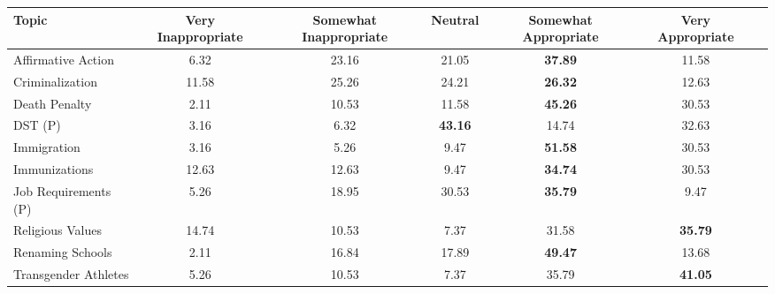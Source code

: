 \begin{tabular}{l*{6}c}\toprule 
Topic & Very Inappropriate & Somewhat Inappropriate & Neutral & Somewhat Appropriate & Very Appropriate \\
\midrule
Affirmative Action & 6.32 & 23.16 & 21.05 & \textbf{37.89} & 11.58 \\
Criminalization & 11.58 & 25.26 & 24.21 & \textbf{26.32} & 12.63 \\
Death Penalty & 2.11 & 10.53 & 11.58 & \textbf{45.26} & 30.53 \\
DST (P) & 3.16 & 6.32 & \textbf{43.16} & 14.74 & 32.63 \\
Immigration & 3.16 & 5.26 & 9.47 & \textbf{51.58} & 30.53 \\
Immunizations & 12.63 & 12.63 & 9.47 & \textbf{34.74} & 30.53 \\
Job Requirements (P) & 5.26 & 18.95 & 30.53 & \textbf{35.79} & 9.47 \\
Religious Values & 14.74 & 10.53 & 7.37 & 31.58 & \textbf{35.79} \\
Renaming Schools & 2.11 & 16.84 & 17.89 & \textbf{49.47} & 13.68 \\
Transgender Athletes & 5.26 & 10.53 & 7.37 & 35.79 & \textbf{41.05} \\
\bottomrule
\end{tabular}
